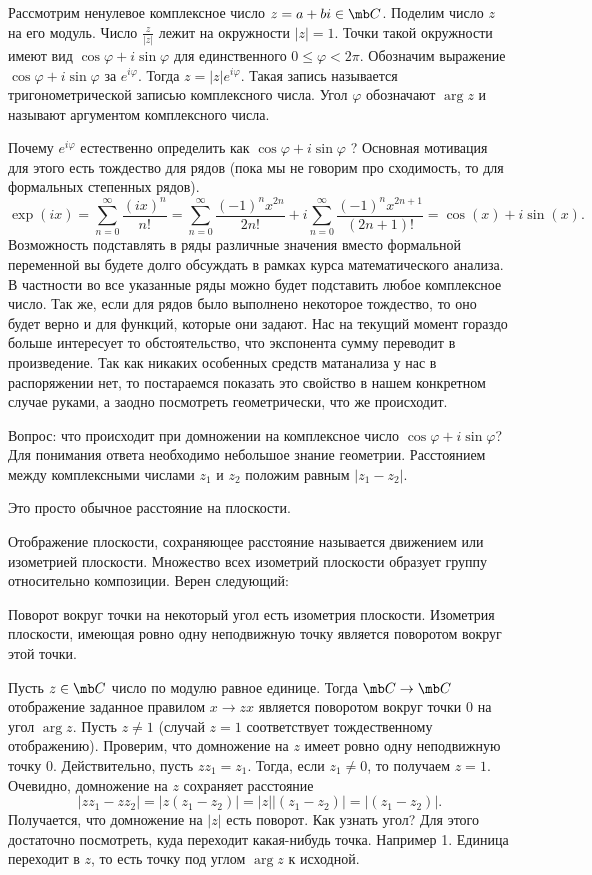  Рассмотрим ненулевое комплексное число $z= a+bi\in\mb C$. Поделим число $z$ на его модуль. Число
$\frac{z}{|z|}$ лежит на окружности $|z| = 1$. Точки такой окружности имеют вид $\cos\varphi +i\sin\varphi$ для единственного $0 \leq \varphi < 2\pi$. Обозначим выражение $\cos\varphi+i\sin\varphi$ за $e^{i\varphi}$. Тогда $z=|z|e^{i\varphi}$.
Такая запись называется тригонометрической записью комплексного числа. Угол $\varphi$ обозначают $\arg z$ и называют
аргументом комплексного числа.
\edfn


Почему $e^{i\varphi}$ естественно определить как $\cos\varphi+i\sin \varphi$ ? Основная мотивация для этого есть тождество для рядов  (пока мы не говорим про сходимость, то для формальных степенных рядов).
$$\exp(ix) = \sum_{n=0}^{\infty} \frac{(ix)^n}{n!}=\sum_{n=0}^{\infty} \frac{(-1)^n x^{2n}}{2n!} + i\sum_{n=0}^{\infty} \frac{(-1)^n x^{2n+1}}{(2n+1)!}= \cos(x) + i\sin(x).$$
Возможность подставлять в ряды различные значения вместо формальной переменной вы будете долго обсуждать в рамках курса математического анализа. В частности во все указанные ряды можно будет подставить любое комплексное число. Так же, если для рядов было выполнено некоторое тождество, то оно будет верно и для функций, которые они задают.
Нас на текущий момент гораздо больше  интересует то обстоятельство, что экспонента сумму переводит в произведение. Так как никаких особенных средств матанализа у нас в распоряжении нет, то постараемся показать это свойство в нашем конкретном случае руками, а заодно посмотреть геометрически, что же происходит.


Вопрос: что происходит при домножении на комплексное число $\cos \varphi + i \sin \varphi$? Для понимания ответа необходимо небольшое знание геометрии.
\dfn[Расстояние] Расстоянием между комплексными числами $z_1$ и $z_2$ положим равным $|z_1-z_2 |$.
\edfn

\rm Это просто обычное расстояние на плоскости.
\erm

Отображение плоскости, сохраняющее расстояние называется движением или изометрией плоскости. Множество всех изометрий плоскости образует группу относительно композиции. Верен следующий:
\begin{fact} Поворот вокруг точки на некоторый угол есть изометрия плоскости. Изометрия плоскости, имеющая ровно
одну неподвижную точку является поворотом вокруг этой точки.
\end{fact}

 Пусть $z\in \mb C$ число по модулю равное единице. Тогда $\mb C \to \mb C$ отображение заданное правилом $ x\to zx$   является поворотом вокруг точки 0 на угол $\arg z$.
\ethrm
\proof Пусть $z\neq 1$ (случай $z=1$ соответствует тождественному отображению). Проверим, что домножение на $z$ имеет ровно одну неподвижную точку 0. Действительно, пусть $zz_1=z_1$. Тогда, если $z_1\neq 0$, то получаем $z=1$. Очевидно, домножение на $z$ сохраняет расстояние $$|zz_1-zz_2|=|z(z_1-z_2)|=|z||(z_1-z_2)|=|(z_1-z_2)|.$$
Получается, что домножение на $|z|$ есть поворот. Как узнать угол? Для этого достаточно посмотреть, куда переходит какая-нибудь точка. Например 1. Единица переходит в $z$, то есть точку под углом $\arg z$ к исходной.
\endproof


